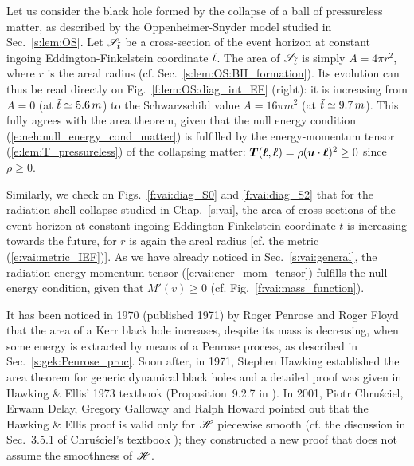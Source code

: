 \begin{example}
Let us consider the black hole formed by the collapse
of a ball of pressureless matter, as described by the Oppenheimer-Snyder
model studied in Sec.~\ref{s:lem:OS}. Let $\mathscr{S}_{{\tilde t}}$ be a
cross-section of the event horizon at constant ingoing Eddington-Finkelstein coordinate ${\tilde t}$.
The area of $\mathscr{S}_{{\tilde t}}$ is simply $A = 4\pi r^2$,
where $r$ is the areal radius (cf. Sec.~\ref{s:lem:OS:BH_formation}). Its
evolution can thus be read directly on Fig.~\ref{f:lem:OS:diag_int_EF} (right):
it is increasing from $A = 0$ (at ${\tilde t}\simeq 5.6\, m$) to the Schwarzschild
value $A = 16\pi m^2$ (at ${\tilde t}\simeq 9.7\, m$). This fully agrees
with the area theorem, given that the null energy condition (\ref{e:neh:null_energy_cond_matter})
is fulfilled by the energy-momentum tensor (\ref{e:lem:T_pressureless}) of the collapsing matter: $\bm{T}(\bm{\ell},\bm{\ell}) =  \rho (\bm{u}\cdot\bm{\ell})^2 \geq 0$ since $\rho \geq 0$.
\end{example}

\begin{example}
Similarly, we check on Figs.~\ref{f:vai:diag_S0} and \ref{f:vai:diag_S2}
that for the radiation shell collapse studied in Chap.~\ref{s:vai},
the area of cross-sections of the event horizon
at constant ingoing Eddington-Finkelstein coordinate $t$
is increasing towards the future, for $r$ is again the areal radius
[cf. the metric (\ref{e:vai:metric_IEF})]. As we have already noticed in
Sec.~\ref{s:vai:general}, the radiation energy-momentum tensor (\ref{e:vai:ener_mom_tensor})
fulfills the null energy condition, given that $M'(v) \geq 0$ (cf. Fig.~\ref{f:vai:mass_function}).
\end{example}


\begin{hist}
It has been noticed in 1970 (published 1971) by Roger Penrose
and Roger Floyd \cite{PenroF71}
that the area of a Kerr black hole increases, despite its mass is decreasing, when
some energy is extracted by means of a Penrose process, as described in Sec.~\ref{s:gek:Penrose_proc}. Soon after, in 1971, Stephen Hawking
\cite{Hawki71} established the area theorem for generic
dynamical black holes and a detailed proof was given in
Hawking \& Ellis' 1973 textbook (Proposition~9.2.7 in \cite{HawkiE73}).
In 2001, Piotr Chru\'sciel,
Erwann Delay,
Gregory Galloway and Ralph Howard
\cite{ChrusDGH01} pointed out that the Hawking \& Ellis proof is
valid only for $\mathscr{H}$ piecewise smooth (cf. the
discussion in Sec.~3.5.1 of Chru\'sciel's textbook \cite{Chrus20}); they constructed
a new proof that does not assume the smoothness of $\mathscr{H}$.
\end{hist}

